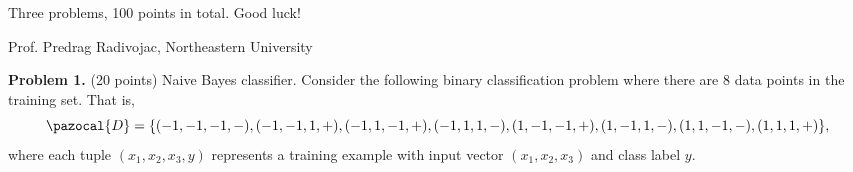 \documentclass[a4 paper]{article}
\begin{document}
	\begin{center}
    Three problems, 100 points in total. Good luck!
    
		Prof. Predrag Radivojac, Northeastern University
	\end{center}
	
	\textbf{Problem 1.}  (20 points) Naive Bayes classifier. Consider the following binary classification problem where there are 8 data points in the training set. That is,
	\begin{equation*}
	\pazocal{D} = \{(-1,-1,-1,-),(-1, -1, 1, +),(-1, 1, -1, +),(-1, 1, 1, -),(1, -1, -1, +),(1, -1, 1, -),(1, 1, -1, -),(1, 1, 1, +)\},
	\end{equation*}
	where each tuple $(x_1,x_2,x_3,y)$ represents a training example with input vector $(x_1,x_2,x_3)$ and class label $y$.
\end{document}
